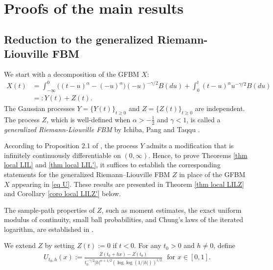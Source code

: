 \documentclass[11pt, reqno]{amsart}
\numberwithin{equation}{section}
\newcommand{\1}{{\bf 1}}
\newcommand{\2}{{\bf 2}}
\begin{document}
\section{Proofs of the main results}
 
\subsection{Reduction to  the generalized Riemann-Liouville FBM}
 {We start with a decomposition of the GFBM $X$:}
 \begin{equation}\label{eq decom}
 \begin{split}
  X(t) &=\int_{-\infty}^0  \big((t-u)^{\alpha}-(-u)^{\alpha} \big) (-u)^{-\gamma/2} B(du)  +\int_0^t  (t-u)^{\alpha}
  u^{-\gamma/2} B(du)\\
  &=: Y(t) + Z(t).
\end{split}
\end{equation}
The Gaussian processes   $Y=\big\{Y(t)\big\}_{t\ge0}$ and  $Z=\big\{Z(t)\big\}_{ t\ge0}$ are independent. The
process $Z$, which is well-defined when $\alpha>-\frac12$ and $\gamma<1$,  is called  a {\it generalized Riemann-Liouville FBM} by Ichiba, Pang and Taqqu \cite{IPT2021}.

According to  Proposition 2.1 of \cite{WX2021a},  the process $Y$  admits a modification that is infinitely continuously differentiable on $(0,\infty)$. Hence, to  prove Theorems \ref{thm local LIL} and \ref{thm local LIL'}, it suffices to establish the corresponding statements for 
  the generalized Riemann–Liouville FBM $Z$ in place  of the  GFBM $X$   appearing in \eqref{eq U}.  These results are  presented  in Theorem \ref{thm local LILZ} and Corollary \ref{coro local LILZ'}  below. 

 {The sample-path properties of $Z$, such as   moment estimates, the exact uniform modulus of continuity, small ball probabilities, and Chung’s laws of the iterated logarithm, are established in \cite[Sections 3–6]{WX2021a}. }

 We extend $Z$ by setting  $Z(t):=0$ if $t< 0$.    For any $t_0>0$ and $h\neq 0$,   define
          \begin{align}\label{eq UZ}
   U_{t_0, h}(x):=\frac{Z(t_0+hx)-Z(t_0)}{t_0^{-\gamma/2}|h|^{\alpha+1/2}\left(  {\log\log}(1/|h|)\right)^{1/2}} \ \ \ \text{for }    x\in [0,1].
   \end{align}
\end{document}

